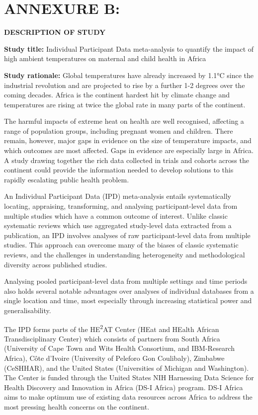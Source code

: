 \documentclass[12pt,letterpaper]{article}
\begin{document}
\section*{ANNEXURE B:}

\textbf{DESCRIPTION OF STUDY}

\textbf{Study title:} Individual Participant Data meta-analysis to quantify the impact of high ambient temperatures on maternal and child health in Africa

\textbf{Study rationale:} Global temperatures have already increased by 1.1°C since the industrial revolution and are projected to rise by a further 1-2 degrees over the coming decades. Africa is the continent hardest hit by climate change and temperatures are rising at twice the global rate in many parts of the continent.

The harmful impacts of extreme heat on health are well recognised, affecting a range of population groups, including pregnant women and children. There remain, however, major gaps in evidence on the size of temperature impacts, and which outcomes are most affected. Gaps in evidence are especially large in Africa. A study drawing together the rich data collected in trials and cohorts across the continent could provide the information needed to develop solutions to this rapidly escalating public health problem.

An Individual Participant Data (IPD) meta-analysis entails systematically locating, appraising, transforming, and analysing participant-level data from multiple studies which have a common outcome of interest. Unlike classic systematic reviews which use aggregated study-level data extracted from a publication, an IPD involves analyses of raw participant-level data from multiple studies. This approach can overcome many of the biases of classic systematic reviews, and the challenges in understanding heterogeneity and methodological diversity across published studies.

Analysing pooled participant-level data from multiple settings and time periods also holds several notable advantages over analyses of individual databases from a single location and time, most especially through increasing statistical power and generalisability.

The IPD forms parts of the HE\textsuperscript{2}AT Center (HEat and HEalth African Transdisciplinary Center) which consists of partners from South Africa (University of Cape Town and Wits Health Consortium, and IBM-Research Africa), Côte d'Ivoire (University of Peleforo Gon Coulibaly), Zimbabwe (CeSHHAR), and the United States (Universities of Michigan and Washington). The Center is funded through the United States NIH Harnessing Data Science for Health Discovery and Innovation in Africa (DS-I Africa) program. DS-I Africa aims to make optimum use of existing data resources across Africa to address the most pressing health concerns on the continent.
\end{document}
